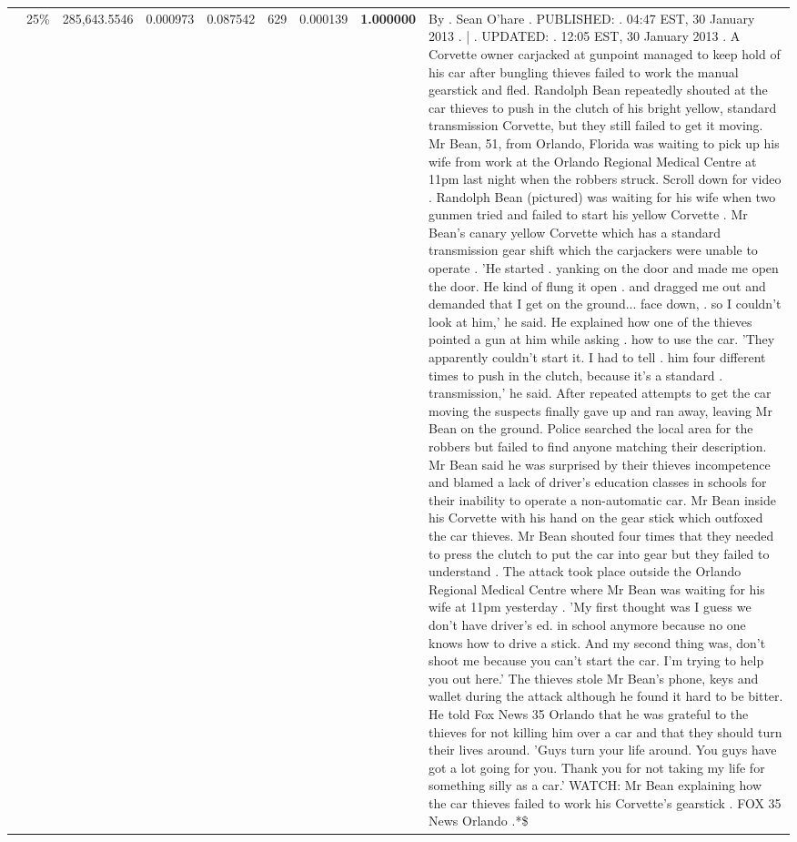 \begin{table}[H]
\begin{tabular}{llrrrrrrl}
 & 25\% & \color{red} 285,643.5546 & 0.000973 & 0.087542 & \color{red} 629 & 0.000139 & \bfseries \color{red} 1.000000 & By . Sean O'hare . PUBLISHED: . 04:47 EST, 30 January 2013 . | . UPDATED: . 12:05 EST, 30 January 2013 . A Corvette owner carjacked at gunpoint managed to keep hold of his car after bungling thieves failed to work the manual gearstick and fled. Randolph Bean repeatedly shouted at the car thieves to push in the clutch of his bright yellow, standard transmission Corvette, but they still failed to get it moving. Mr Bean, 51, from Orlando, Florida was waiting to pick up his wife from work at the Orlando Regional Medical Centre at 11pm last night when the robbers struck. Scroll down for video . Randolph Bean (pictured) was waiting for his wife when two gunmen tried and failed to start his yellow Corvette . Mr Bean's canary yellow Corvette which has a standard transmission gear shift which the carjackers were unable to operate . 'He started . yanking on the door and made me open the door. He kind of flung it open . and dragged me out and demanded that I get on the ground... face down, . so I couldn't look at him,' he said. He explained how one of the thieves pointed a gun at him while asking . how to use the car. 'They apparently couldn't start it. I had to tell . him four different times to push in the clutch, because it's a standard . transmission,' he said. After repeated attempts to get the car moving the suspects finally gave up and ran away, leaving Mr Bean on the ground. Police searched the local area for the robbers but failed to find anyone matching their description. Mr Bean said he was surprised by their thieves incompetence and blamed a lack of driver's education classes in schools for their inability to operate a non-automatic car. Mr Bean inside his Corvette with his hand on the gear stick which outfoxed the car thieves. Mr Bean shouted four times that they needed to press the clutch to put the car into gear but they failed to understand . The attack took place outside the Orlando Regional Medical Centre where Mr Bean was waiting for his wife at 11pm yesterday . 'My first thought was I guess we don't have driver's ed. in school anymore because no one knows how to drive a stick. And my second thing was, don't shoot me because you can't start the car. I'm trying to help you out here.' The thieves stole Mr Bean's phone, keys and wallet during the attack although he found it hard to be bitter. He told Fox News 35 Orlando that he was grateful to the thieves for not killing him over a car and that they should turn their lives around. 'Guys turn your life around. You guys have got a lot going for you. Thank you for not taking my life for something silly as a car.' WATCH: Mr Bean explaining how the car thieves failed to work his Corvette's gearstick . FOX 35 News Orlando .*\$ \\

\end{tabular}
\end{table}
